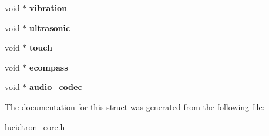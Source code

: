 \begin{DoxyCompactItemize}
\item 
void $\ast$ {\bfseries vibration}\hypertarget{structlucidtron__peripheral__device_a8032b446d21adea0bd5984d84f91bb4a}{}\label{structlucidtron__peripheral__device_a8032b446d21adea0bd5984d84f91bb4a}

\item 
void $\ast$ {\bfseries ultrasonic}\hypertarget{structlucidtron__peripheral__device_a3720deb16ac51e81d71e0b15434b2608}{}\label{structlucidtron__peripheral__device_a3720deb16ac51e81d71e0b15434b2608}

\item 
void $\ast$ {\bfseries touch}\hypertarget{structlucidtron__peripheral__device_a5a331363c6ce124d6514773033bcbf31}{}\label{structlucidtron__peripheral__device_a5a331363c6ce124d6514773033bcbf31}

\item 
void $\ast$ {\bfseries ecompass}\hypertarget{structlucidtron__peripheral__device_a4afc3ff39e3e2b1db43a01b408f82ec8}{}\label{structlucidtron__peripheral__device_a4afc3ff39e3e2b1db43a01b408f82ec8}

\item 
void $\ast$ {\bfseries audio\+\_\+codec}\hypertarget{structlucidtron__peripheral__device_a417b17cfc723573213ea027ae7c2a333}{}\label{structlucidtron__peripheral__device_a417b17cfc723573213ea027ae7c2a333}

\end{DoxyCompactItemize}


The documentation for this struct was generated from the following file\+:\begin{DoxyCompactItemize}
\item 
\hyperlink{lucidtron__core_8h}{lucidtron\+\_\+core.\+h}\end{DoxyCompactItemize}
